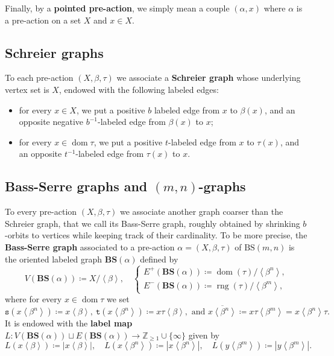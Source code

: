 \documentclass[12pt]{article}
\numberwithin{equation}{section}
\theoremstyle{definition}
\DeclareMathOperator{\dom}{\mathrm{dom}}
\DeclareMathOperator{\rng}{\mathrm{rng}}
\newcommand{\Z}{\mathbb{Z}}
\newcommand{\inv}{^{-1}}
\newcommand{\la}{\left\langle}
\newcommand{\ra}{\right\rangle}
\newcommand{\abs}[1]{\left\lvert #1\right\rvert}
\newcommand\BSo{\mathrm{BS}}
\newcommand\BSe{\mathbf{BS}}
\newcommand{\source}{\mathtt{s}}
\newcommand{\target}{\mathtt{t}}
\begin{document}
Finally, by a \textbf{pointed pre-action}, we simply  mean a couple \( (\alpha,x) \) where \(\alpha\) is a pre-action on a set \(X\) and \(x\in X\).
\subsection{Schreier graphs}
 
To each pre-action \( (X,\beta,\tau) \) we associate a \textbf{Schreier graph} 
 whose underlying vertex set is \(X\), endowed with the following labeled edges:
 \begin{itemize}
	\item for every \( x\in X \), 
	we put a positive \(b\) labeled edge from \(x\) to \(\beta(x)\),
	and an opposite negative \( b\inv \)-labeled edge from \(\beta(x)\) to \(x\);
	\item for every \(x\in \dom \tau\), we put a positive \(t\)-labeled edge from \(x\) to \(\tau(x)\), and an opposite \( t\inv \)-labeled edge from \(\tau(x)\) to \(x\).
 \end{itemize}


\subsection{Bass-Serre graphs and \texorpdfstring{\((m,n)\)}{Bass-Serre graphs and (m,n)}-graphs}

To every pre-action \( (X,\beta,\tau) \) we associate another graph coarser 
than the Schreier graph, that we call its Bass-Serre graph, roughly obtained by shrinking \(b\)-orbits
to vertices while keeping track of their cardinality. 
To be more precise, the \textbf{Bass-Serre graph} associated to a pre-action \(\alpha=(X,\beta,\tau)\) of \( \BSo(m,n) \)
is the oriented labeled graph \( \BSe(\alpha) \) defined by
\[
V(\BSe(\alpha))\coloneqq X/\la\beta\ra, \quad
\left\{\begin{array}{l}
	E^+(\BSe(\alpha))\coloneqq\dom(\tau)/\la\beta^n\ra,  \\
	E^-(\BSe(\alpha))\coloneqq\rng(\tau)/\la\beta^m\ra,
\end{array}\right.
\]
where for every \(x\in\dom \tau\) we set
\[\source(x\la \beta^n\ra)\coloneqq x\la \beta\ra,\  \target(x\la \beta^n\ra)\coloneqq x\tau\la \beta\ra,\text{ and }\overline{x\la \beta^n\ra}\coloneqq x\tau \la \beta^m\ra=x\la \beta^n\ra \tau.\]
It is endowed with the \textbf{label map} \( L\colon V(\BSe(\alpha))\sqcup E(\BSe(\alpha))\to \Z_{\geq 1}\cup \{\infty\} \) given by
\[
L(x\la\beta\ra)\coloneqq\abs{x\la\beta\ra},
\quad L(x\la\beta^n\ra)\coloneqq \abs{x\la\beta^n\ra},
\quad L(y\la\beta^m\ra)\coloneqq \abs{y\la\beta^m\ra}.
\]
\end{document}
